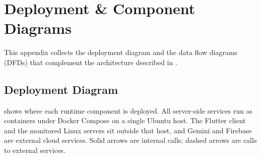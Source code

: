 \chapter{Deployment \& Component Diagrams}\label{app:deploy}

This appendix collects the deployment diagram and the data flow diagrams
(DFDs) that complement the architecture described in .

\section{Deployment Diagram}\label{sec:deploy_diagram}

 shows where each runtime component is deployed.  All
server-side services run as containers under Docker Compose on a single
Ubuntu host.  The Flutter client and the monitored Linux servers sit outside
that host, and Gemini and Firebase are external cloud services.  Solid arrows
are internal calls; dashed arrows are calls to external services.

